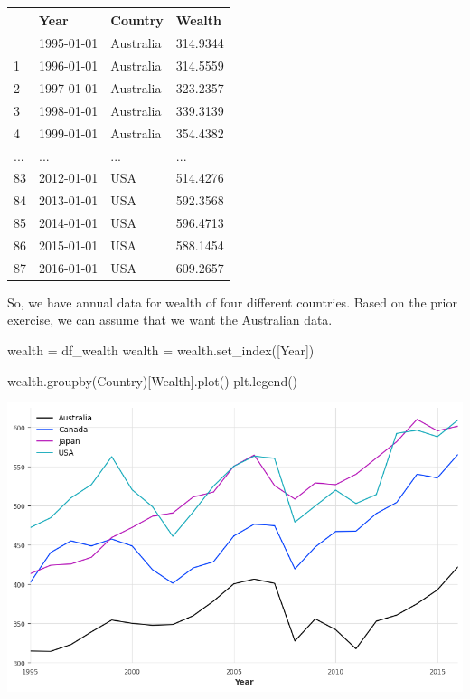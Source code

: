 \documentclass[
  11pt,
]{article}
\newenvironment{Shaded}{\begin{snugshade}}{\end{snugshade}}
\newcommand{\NormalTok}[1]{\textcolor[rgb]{0.00,0.23,0.31}{#1}}
\newcommand{\OperatorTok}[1]{\textcolor[rgb]{0.37,0.37,0.37}{#1}}
\newcommand{\StringTok}[1]{\textcolor[rgb]{0.13,0.47,0.30}{#1}}
\begin{document}
\begin{longtable}[]{@{}llll@{}}
\toprule\noalign{}
& Year & Country & Wealth \\
\midrule\noalign{}
\endhead
\bottomrule\noalign{}
\endlastfoot
0 & 1995-01-01 & Australia & 314.9344 \\
1 & 1996-01-01 & Australia & 314.5559 \\
2 & 1997-01-01 & Australia & 323.2357 \\
3 & 1998-01-01 & Australia & 339.3139 \\
4 & 1999-01-01 & Australia & 354.4382 \\
... & ... & ... & ... \\
83 & 2012-01-01 & USA & 514.4276 \\
84 & 2013-01-01 & USA & 592.3568 \\
85 & 2014-01-01 & USA & 596.4713 \\
86 & 2015-01-01 & USA & 588.1454 \\
87 & 2016-01-01 & USA & 609.2657 \\
\end{longtable}

So, we have annual data for wealth of four different countries. Based on
the prior exercise, we can assume that we want the Australian data.

\begin{Shaded}
\begin{Highlighting}[]
\NormalTok{wealth }\OperatorTok{=}\NormalTok{ df\_wealth}
\NormalTok{wealth }\OperatorTok{=}\NormalTok{ wealth.set\_index([}\StringTok{\textquotesingle{}Year\textquotesingle{}}\NormalTok{])}

\NormalTok{wealth.groupby(}\StringTok{\textquotesingle{}Country\textquotesingle{}}\NormalTok{)[}\StringTok{\textquotesingle{}Wealth\textquotesingle{}}\NormalTok{].plot()}
\NormalTok{plt.legend()}
\end{Highlighting}
\end{Shaded}

\includegraphics{hw3_files/figure-pdf/cell-21-output-1.png}
\end{document}
